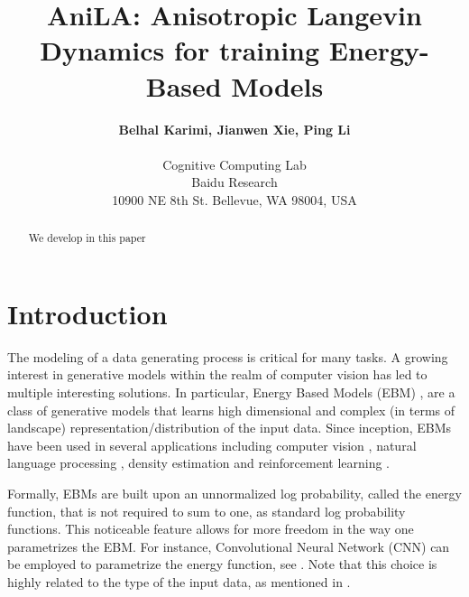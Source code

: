 \documentclass{article}
\begin{document}
\title{AniLA: Anisotropic Langevin Dynamics for training Energy-Based Models}

 \author{\textbf{Belhal Karimi, Jianwen Xie, Ping Li} \\\\
 Cognitive Computing Lab\\
 Baidu Research\\
   10900 NE 8th St. Bellevue, WA 98004, USA
 }

\date{}
\maketitle

\begin{abstract}
We develop in this paper
\end{abstract}

\section{Introduction}
The modeling of a data generating process is critical for many tasks.
A growing interest in generative models within the realm of computer vision has led to multiple interesting solutions.
In particular, Energy Based Models (EBM) \citep{zhu1998filters,lecun2006tutorial}, are a class of generative models that learns high dimensional and complex (in terms of landscape) representation/distribution of the input data.
Since inception, EBMs have been used in several applications including computer vision \citep{ngiam2011learning, xie2016theory,xie2020generative,du2019implicit}, natural language processing \citep{mikolov2013distributed,deng2020residual},  density estimation \citep{wenliang2019learning,song2020sliced} and reinforcement learning \citep{haarnoja2017reinforcement}.

Formally, EBMs are built upon an unnormalized log probability, called the energy function, that is not required to sum to one, as standard log probability functions.
This noticeable feature allows for more freedom in the way one parametrizes the EBM.
For instance, Convolutional Neural Network (CNN) can be employed to parametrize the energy function, see \citep{xie2016theory}.
Note that this choice is highly related to the type of the input data, as mentioned in \citep{song2021train}.
\end{document}
